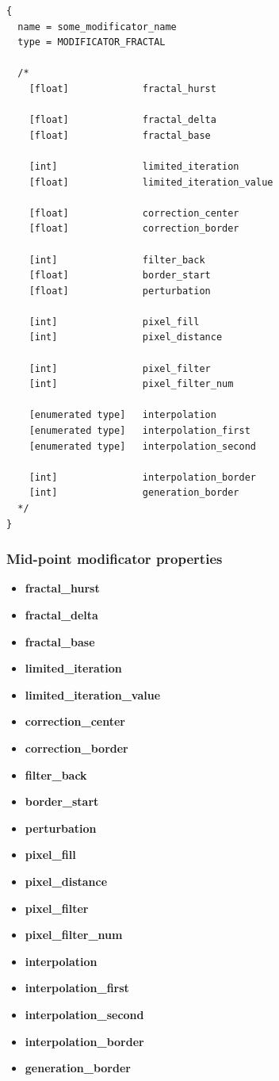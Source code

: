 \documentclass[9pt]{article}
\begin{document}
\begin{verbatim}
{
  name = some_modificator_name
  type = MODIFICATOR_FRACTAL

  /*
    [float]             fractal_hurst
  
    [float]             fractal_delta
    [float]             fractal_base
    
    [int]               limited_iteration
    [float]             limited_iteration_value
    
    [float]             correction_center
    [float]             correction_border
    
    [int]               filter_back
    [float]             border_start
    [float]             perturbation
    
    [int]               pixel_fill
    [int]               pixel_distance
    
    [int]               pixel_filter
    [int]               pixel_filter_num
  
    [enumerated type]   interpolation
    [enumerated type]   interpolation_first
    [enumerated type]   interpolation_second
    
    [int]               interpolation_border      
    [int]               generation_border
  */  
}
\end{verbatim}
\subsubsection*{Mid-point modificator properties}
\begin{itemize}
\item{\bf fractal\_hurst}
\item{\bf fractal\_delta}
\item{\bf fractal\_base}
\item{\bf limited\_iteration}
\item{\bf limited\_iteration\_value}
\item{\bf correction\_center}
\item{\bf correction\_border}
\item{\bf filter\_back}
\item{\bf border\_start}
\item{\bf perturbation}
\item{\bf pixel\_fill}
\item{\bf pixel\_distance}
\item{\bf pixel\_filter}
\item{\bf pixel\_filter\_num}
\item{\bf interpolation}
\item{\bf interpolation\_first}
\item{\bf interpolation\_second}
\item{\bf interpolation\_border}
\item{\bf generation\_border}
\end{itemize}
\end{document}
